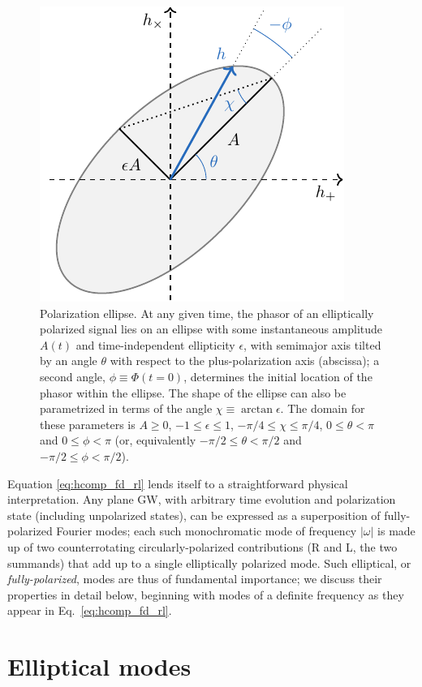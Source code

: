 \documentclass[aps,prd,twocolumn,superscriptaddress,preprintnumbers,floatfix,nofootinbib]{revtex4-2}
\newcommand*{\eq}[1]{Eq.~\eqref{eq:#1}}
\begin{document}
\begin{figure}
\includegraphics[width=0.7\columnwidth]{diagram_ellipse.pdf}
\caption{Polarization ellipse. At any given time, the phasor of an elliptically polarized signal lies on an ellipse with some instantaneous amplitude $A(t)$ and time-independent ellipticity $\epsilon$, with semimajor axis tilted by an angle $\theta$ with respect to the plus-polarization axis (abscissa); a second angle, $\phi \equiv \Phi(t=0)$, determines the initial location of the phasor within the ellipse.
The shape of the ellipse can also be parametrized in terms of the angle $\chi \equiv \arctan \epsilon$.
The domain for these parameters is $A \geq 0$, $-1 \leq \epsilon \leq 1$, $-\pi/4 \leq \chi \leq \pi/4$, $0 \leq \theta < \pi$ and $0 \leq \phi < \pi$ (or, equivalently $-\pi/2 \leq \theta < \pi/2$ and $-\pi/2 \leq \phi < \pi/2$).
}
\label{fig:ellipse}
\end{figure}

Equation \eqref{eq:hcomp_fd_rl} lends itself to a straightforward physical interpretation.
Any plane GW, with arbitrary time evolution and polarization state (including unpolarized states), can be expressed as a superposition of fully-polarized Fourier modes;
each such monochromatic mode of frequency $|\omega|$ is made up of two counterrotating circularly-polarized contributions (R and L, the two summands) that add up to a single elliptically polarized mode.
Such elliptical, or \emph{fully-polarized}, modes are thus of fundamental importance; we discuss their properties in detail below, beginning with modes of a definite frequency as they appear in \eq{hcomp_fd_rl}.

\section{Elliptical modes}
\label{sec:ellip}
\end{document}
